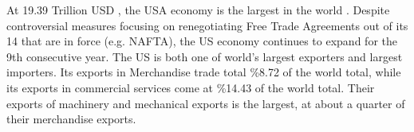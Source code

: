 \documentclass[../main.tex]{subfiles}
\begin{document}
At 19.39 Trillion USD , the USA economy is the largest in the world \parencite{DataSciencesPo}.
Despite controversial measures focusing on renegotiating Free Trade Agreements out of its 14 that are in force (e.g. NAFTA),
 the US economy continues to expand for the 9th consecutive year.
The US is both one of world’s largest exporters and largest importers. Its exports in Merchandise trade total \%8.72 of the world total, while its exports in commercial services come at \%14.43 of the world total. Their exports of machinery and mechanical exports is the largest, at about a quarter of their merchandise exports.
\end{document}
